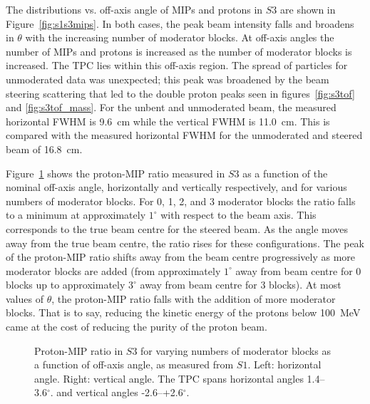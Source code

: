 The distributions vs. off-axis angle of MIPs and protons in $\mathit{S3}$ are shown in Figure~\ref{fig:s1s3mips}.
In both cases, the peak beam intensity falls and broadens in $\theta$ with the increasing number of moderator blocks. 
At off-axis angles the number of MIPs and protons is increased as the number of moderator blocks is increased.
The TPC lies within this off-axis region.
The spread of particles for unmoderated data was unexpected; this peak was broadened by the beam steering scattering that led to the double proton peaks seen in figures~\ref{fig:s3tof} and \ref{fig:s3tof_mass}.
For the unbent and unmoderated beam, the measured horizontal FWHM is 9.6~cm while the vertical FWHM is 11.0~cm.
This is compared with the measured horizontal FWHM for the unmoderated and steered beam of 16.8~cm.

Figure~\ref{fig:propiratio_s3_horz} shows the proton-MIP ratio measured in $\mathit{S3}$ as a function of the nominal off-axis angle, horizontally and vertically respectively, and for various numbers of moderator blocks.
For 0, 1, 2, and 3 moderator blocks the ratio falls to a minimum at approximately $1^{\circ}$ with respect to the beam axis.
This corresponds to the true beam centre for the steered beam.
As the angle moves away from the true beam centre, the ratio rises for these configurations.
The peak of the proton-MIP ratio shifts away from the beam centre progressively as more moderator blocks are added (from approximately $1^{\circ}$ away from beam centre for 0 blocks up to approximately $3^{\circ}$ away from beam centre for 3 blocks).
At most values of $\theta$, the proton-MIP ratio falls with the addition of more moderator blocks. 
That is to say, reducing the kinetic energy of the protons below 100~MeV came at the cost of reducing the purity of the proton beam.

\begin{figure}[!ht]
  \begin{minipage}[t]{0.48\textwidth}
    \begin{adjustbox}{max totalsize={\textwidth}{.35\textheight}, center}
      
    \end{adjustbox}
    
  \end{minipage}
  \hspace{0.3cm}
  \begin{minipage}[t]{0.48\textwidth}
    \begin{adjustbox}{max totalsize={\textwidth}{.35\textheight}, center}
      
    \end{adjustbox}
  \end{minipage}	
  \caption{\label{fig:propiratio_s3_horz}Proton-MIP ratio in $\mathit{S3}$ for varying numbers of moderator blocks as a function of off-axis angle, as measured from $\mathit{S1}$.  Left: horizontal angle. Right: vertical angle. The TPC spans horizontal angles 1.4--3.6$^{ \circ }$. and vertical angles -2.6--+2.6$^{ \circ }$.}
\end{figure}

